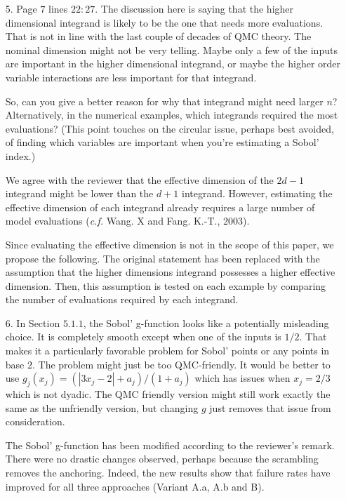 \documentclass[10pt,a4paper]{article}
\begin{document}
\begin{itemize}
\item[5.] Page $7$ lines $22:27$. The discussion here is saying that the higher dimensional integrand is likely to be the one that needs more evaluations. That is not in line with the last couple of decades of QMC theory. The nominal dimension might not be very telling. Maybe only a few of the inputs are important in the higher dimensional integrand, or maybe the higher order variable interactions are less important for that integrand.

So, can you give a better reason for why that integrand might need larger $n$? Alternatively, in the numerical examples, which integrands required the most evaluations?
(This point touches on the circular issue, perhaps best avoided, of finding which variables are important when you're estimating a Sobol' index.)

{\color{blue} We agree with the reviewer that the effective dimension of the $2d-1$ integrand might be lower than the $d+1$ integrand. However, estimating the effective dimension of each integrand already requires a large number of model evaluations (\textit{c.f.} Wang. X and Fang. K.-T., 2003).

Since evaluating the effective dimension is not in the scope of this paper, we propose the following. The original statement has been replaced with the assumption that the higher dimensions integrand possesses a higher effective dimension. Then, this assumption is tested on each example by comparing the number of evaluations required by each integrand.}


\item[6.] In Section $5.1.1$, the Sobol' g-function looks like a potentially misleading choice. It is completely smooth except when one of the inputs is $1/2$.
That makes it a particularly favorable problem for Sobol' points or any points in base $2$. The problem might just be too QMC-friendly. It would be better to use $g_j(x_j) = (|3x_j-2| + a_j)/(1 + a_j)$ which has issues when
$x_j = 2/3$ which is not dyadic. The QMC friendly version might still work exactly the same as the unfriendly version, but changing $g$ just removes that issue from consideration.

{\color{blue} The Sobol' g-function has been modified according to the reviewer's remark. There were no drastic changes observed, perhaps because the scrambling removes the anchoring. Indeed, the new results show that failure rates have improved for all three approaches (Variant A.a, A.b and B).} 


\end{itemize}
\end{document}
